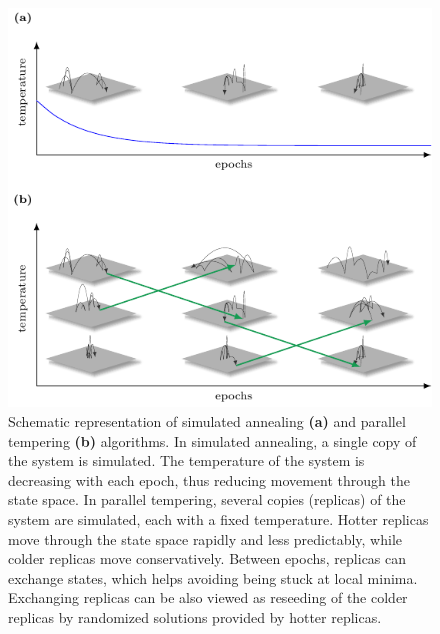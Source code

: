 \begin{figure}[h]
    \centering
    \includegraphics[width=\textwidth]{figures/pt_and_sa.pdf}
    \caption{Schematic representation of simulated annealing \textbf{(a)} and parallel tempering \textbf{(b)} algorithms. In simulated annealing, a single copy of the system is simulated. The temperature of the system is decreasing with each epoch, thus reducing movement through the state space. In parallel tempering, several copies (replicas) of the system are simulated, each with a fixed temperature. Hotter replicas move through the state space rapidly and less predictably, while colder replicas move conservatively. Between epochs, replicas can exchange states, which helps avoiding being stuck at local minima. Exchanging replicas can be also viewed as reseeding of the colder replicas by randomized solutions provided by hotter replicas.}
    \label{fig:my_label}
\end{figure}
